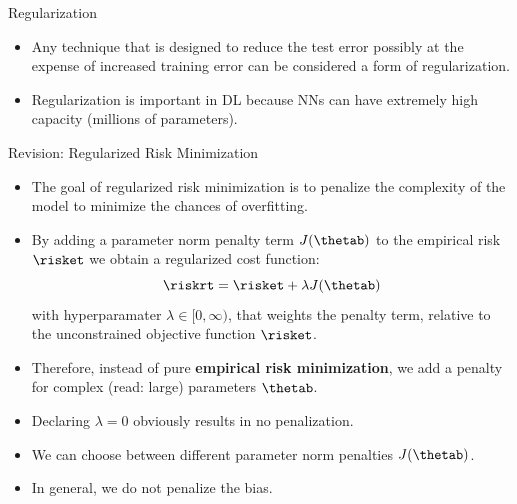 






\begin{frame} {Regularization}
\begin{itemize}
\item Any technique that is designed to reduce the test error possibly at the expense of increased training error can be considered a form of regularization.
\item Regularization is important in DL because NNs can have extremely high capacity (millions of parameters).
\end{itemize}
\end{frame}

\begin{vbframe}{Revision: Regularized Risk Minimization}
\begin{itemize}
\item The goal of regularized risk minimization is to penalize the complexity of the model to minimize the chances of overfitting.
\item By adding a parameter norm penalty term \(J(\thetab)\) to the empirical risk $\risket$ we obtain a regularized cost function:
$$\riskrt = \risket + \lambda \text{\(J(\thetab)\)}$$
with hyperparamater $\lambda \in [0, \infty)$, that weights the penalty term, relative to the unconstrained objective function $\risket$.
\item Therefore, instead of pure \textbf{empirical risk minimization}, we add a penalty
for complex (read: large) parameters \(\thetab\).
\item Declaring $\lambda = 0$ obviously results in no penalization.
\item We can choose between different parameter norm penalties \(J(\thetab)\).
\item In general, we do not penalize the bias.
\end{itemize}
\end{vbframe}

